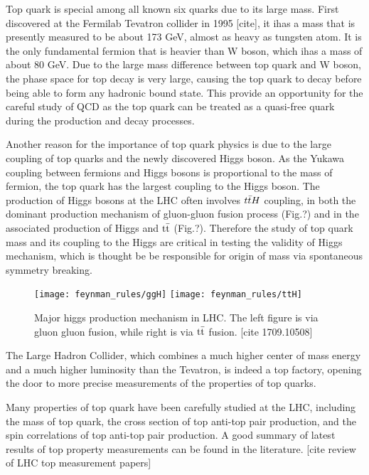 \clearpage

Top quark is special among all known six quarks due to its large mass. First discovered at the Fermilab Tevatron collider in 1995 [cite], it ihas a mass that is presently measured to be about 173 GeV, almost as heavy as tungsten atom.  It is the only fundamental fermion that is heavier than W boson, which ihas a mass of about 80 GeV. Due to the large mass difference between top quark and W boson, the phase space for top decay is very large, causing the top quark to decay before being able to form any hadronic bound state. This provide an opportunity for the careful study of QCD as the top quark can be treated as a quasi-free quark during the production and decay processes.

Another reason for the importance of top quark physics is due to the large coupling of top quarks and the newly discovered Higgs boson. As the Yukawa coupling between fermions and Higgs bosons is proportional to the mass of fermion, the top quark has the largest coupling to the Higgs boson. The production of Higgs bosons at the LHC often involves $t\bar{t}H$ coupling, in both the dominant production mechanism of gluon-gluon fusion process (Fig.?) and in the associated production of Higgs and $\mathrm{t}\bar{\mathrm{t}}$ (Fig.?). Therefore the study of top quark mass and its coupling to the Higgs are critical in testing the validity of Higgs mechanism, which is thought be be responsible for origin of mass via spontaneous symmetry breaking. 

\begin{figure}[hbt]
	\begin{center}
		\texttt{[image: feynman\_rules/ggH]}
		\texttt{[image: feynman\_rules/ttH]}
		\caption{\small Major higgs production mechanism in LHC. The left figure is via gluon gluon fusion, while right is via $\mathrm{t}\bar{\mathrm{t}}$ fusion.  [cite 1709.10508] }
		\label{fig:ttg}
	\end{center}
\end{figure}


The Large Hadron Collider, which combines a much higher center of mass energy and a much higher luminosity than the Tevatron, is indeed a top factory, opening the door to more precise measurements of the properties of top quarks.

Many properties of top quark have been carefully studied at the LHC, including the mass of top quark, the cross section of top anti-top pair production, and the spin correlations of top anti-top pair production. A good summary of latest results of top property measurements can be found in the literature. [cite review of LHC top measurement papers] 

